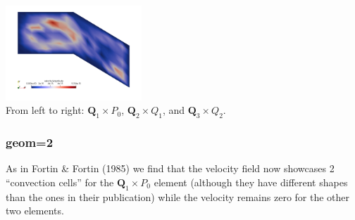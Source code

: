 \begin{center}
\includegraphics[width=5.1cm]{python_codes/fieldstone_42/results/geom1/vel3}\\
{\captionfont From left to right: ${\bm Q}_1\times P_0$, ${\bm Q}_2\times Q_1$, 
and ${\bm Q}_3\times Q_2$.}
\end{center}

\subsubsection*{geom=2}

As in Fortin \& Fortin (1985) we find that the velocity field now showcases 2 ``convection
cells'' for the  ${\bm Q}_1\times P_0$ element (although they have different shapes than 
the ones in their publication) while the velocity remains zero for the other two elements. 

